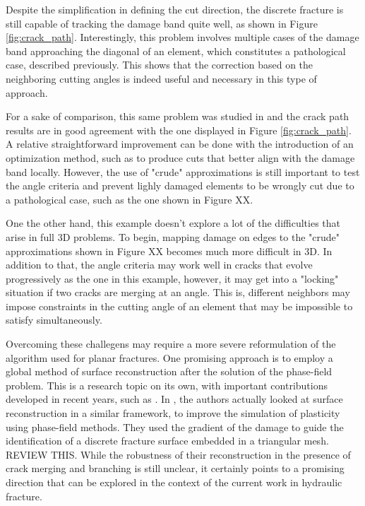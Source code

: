 Despite the simplification in defining the cut direction, the discrete fracture is still capable of tracking the damage band quite well, as shown in Figure \ref{fig:crack_path}. Interestingly, this problem involves multiple cases of the damage band approaching the diagonal of an element, which constitutes a pathological case, described previously. This shows that the correction based on the neighboring cutting angles is indeed useful and necessary in this type of approach.

For a sake of comparison, this same problem was studied in \cite{giovanardi2017hybrid} and the crack path results are in good agreement with the one displayed in Figure \ref{fig:crack_path}. A relative straightforward improvement can be done with the introduction of an optimization method, such as \cite{geelen2018optimization} to produce cuts that better align with the damage band locally. However, the use of "crude" approximations is still important to test the angle criteria and prevent lighly damaged elements to be wrongly cut due to a pathological case, such as the one shown in Figure XX.

One the other hand, this example doesn't explore a lot of the difficulties that arise in full 3D problems. To begin, mapping damage on edges to the "crude" approximations shown in Figure XX becomes much more difficult in 3D. In addition to that, the angle criteria may work well in cracks that evolve progressively as the one in this example, however, it may get into a "locking" situation if two cracks are merging at an angle. This is, different neighbors may impose constraints in the cutting angle of an element that may be impossible to satisfy simultaneously. 

Overcoming these challegens may require a more severe reformulation of the algorithm used for planar fractures. One promising approach is to employ a global method of surface reconstruction after the solution of the phase-field problem. This is a research topic on its own, with important contributions developed in recent years, such as \cite{}. In \cite{}, the authors actually looked at surface reconstruction in a similar framework, to improve the simulation of plasticity using phase-field methods. They used the gradient of the damage to guide the identification of a discrete fracture surface embedded in a triangular mesh. REVIEW THIS. While the robustness of their reconstruction in the presence of crack merging and branching is still unclear, it certainly points to a promising direction that can be explored in the context of the current work in hydraulic fracture.

